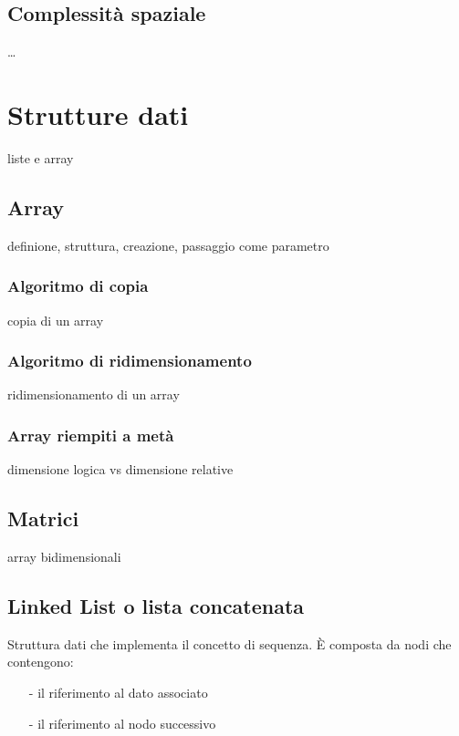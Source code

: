 \documentclass{article}
\begin{document}
\subsection{Complessità spaziale}
\dots

\newpage

\section{Strutture dati}
liste e array

\subsection{Array}
definione, struttura, creazione, passaggio come parametro

\subsubsection*{Algoritmo di copia}
copia di un array

\subsubsection*{Algoritmo di ridimensionamento}
ridimensionamento di un array

\subsubsection*{Array riempiti a metà}
dimensione logica vs dimensione relative

\subsection{Matrici}
array bidimensionali

\subsection{Linked List o lista concatenata}
Struttura dati che implementa il concetto di sequenza. È composta da nodi che contengono:
\begin{itemize} [topsep=3pt, itemsep=0pt]
	\item[-] il riferimento al dato associato
	\item[-] il riferimento al nodo successivo
\end{itemize}
\end{document}

